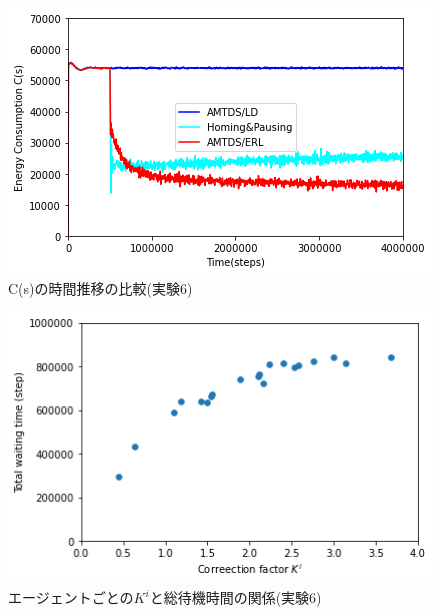 \documentclass[12pt,a4j,twoside]{jarticle}
\begin{document}
  \begin{figure}
    \centering
    \includegraphics[width=150mm]{figures/cs_graph_3600_ave_ERL_Complex_1000.png}
    \caption{C(s)の時間推移の比較(実験6)}
    \label{fig:cs_ERL_Complex}
  \end{figure}

  \begin{figure}
    \centering
    \includegraphics[width=150mm]{figures/CorrectionScatter_Complex_ERL.png}
    \caption{エージェントごとの$K^i$と総待機時間の関係(実験6)}
    \label{fig:cscatter_ERL_Complex}
  \end{figure}
\end{document}
